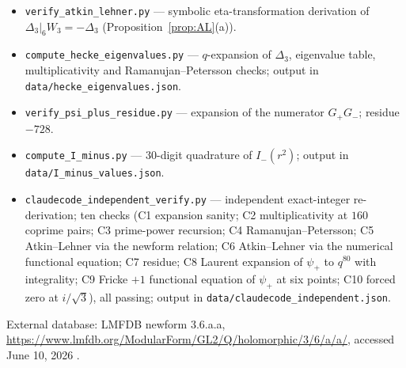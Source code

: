 \documentclass[11pt,reqno]{amsart}
\theoremstyle{plain}
\theoremstyle{definition}
\theoremstyle{remark}
\newcommand{\Dthree}{\Delta_{3}}
\newcommand{\psip}{\psi_{+}}
\newcommand{\Imm}{I_{-}}
\begin{document}
\begin{itemize}
\item \texttt{verify\_atkin\_lehner.py} --- symbolic eta-transformation
derivation of $\Dthree|_6W_3=-\Dthree$ (Proposition~\ref{prop:AL}(a)).
\item \texttt{compute\_hecke\_eigenvalues.py} --- $q$-expansion of
$\Dthree$, eigenvalue table, multiplicativity and
Ramanujan--Petersson checks; output in
\texttt{data/hecke\_eigenvalues.json}.
\item \texttt{verify\_psi\_plus\_residue.py} --- expansion of the
numerator $G_+G_-$; residue $-728$.
\item \texttt{compute\_I\_minus.py} --- $30$-digit quadrature of
$\Imm(r^2)$; output in \texttt{data/I\_minus\_values.json}.
\item \texttt{claudecode\_independent\_verify.py} --- independent
exact-integer re-derivation; ten checks (C1 expansion sanity; C2
multiplicativity at $160$ coprime pairs; C3 prime-power recursion; C4
Ramanujan--Petersson; C5 Atkin--Lehner via the newform relation; C6
Atkin--Lehner via the numerical functional equation; C7 residue; C8
Laurent expansion of $\psip$ to $q^{80}$ with integrality; C9 Fricke
$+1$ functional equation of $\psip$ at six points; C10 forced zero at
$i/\sqrt3$), all passing; output in
\texttt{data/claudecode\_independent.json}.
\end{itemize}

External database: LMFDB newform \textsf{3.6.a.a},
\url{https://www.lmfdb.org/ModularForm/GL2/Q/holomorphic/3/6/a/a/},
accessed June 10, 2026 \cite{LMFDB}.

\end{document}
